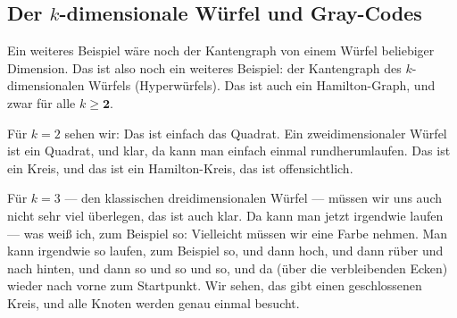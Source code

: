 \begin{math-stroke}
\begin{center}
\end{center}
\end{math-stroke}

\subsection{Der \texorpdfstring{$k$}{k}-dimensionale Würfel und Gray-Codes}

\begin{spoken-clean}[00:38:07 - 00:40:08]
Ein weiteres Beispiel wäre noch der Kantengraph von einem Würfel beliebiger Dimension. Das ist also noch ein weiteres Beispiel: der Kantengraph des $k$-dimensionalen Würfels (Hyperwürfels). Das ist auch ein Hamilton-Graph, und zwar für alle $k \ge \textbf{2}$. 

Für $k = 2$ sehen wir: Das ist einfach das Quadrat. Ein zweidimensionaler Würfel ist ein Quadrat, und klar, da kann man einfach einmal rundherumlaufen. Das ist ein Kreis, und das ist ein Hamilton-Kreis, das ist offensichtlich.

Für $k = 3$ --- den klassischen dreidimensionalen Würfel --- müssen wir uns auch nicht sehr viel überlegen, das ist auch klar. Da kann man jetzt irgendwie laufen --- was weiß ich, zum Beispiel so: Vielleicht müssen wir eine Farbe nehmen. Man kann irgendwie so laufen, zum Beispiel so, und dann hoch, und dann rüber und nach hinten, und dann so und so und so, und da (über die verbleibenden Ecken) wieder nach vorne zum Startpunkt. Wir sehen, das gibt einen geschlossenen Kreis, und alle Knoten werden genau einmal besucht.
\end{spoken-clean}

